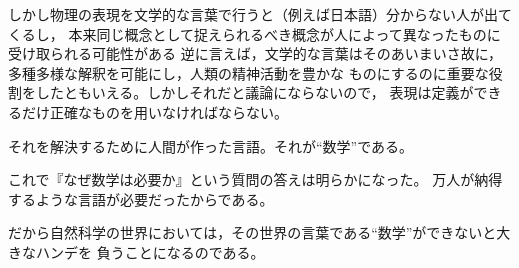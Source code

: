 しかし物理の表現を文学的な言葉で行うと（例えば日本語）分からない人が出てくるし，
本来同じ概念として捉えられるべき概念が人によって異なったものに受け取られる可能性がある
逆に言えば，文学的な言葉はそのあいまいさ故に，多種多様な解釈を可能にし，人類の精神活動を豊かな
ものにするのに重要な役割をしたともいえる。しかしそれだと議論にならないので，
表現は定義ができるだけ正確なものを用いなければならない。

それを解決するために人間が作った言語。それが“数学”である。

これで『なぜ数学は必要か』という質問の答えは明らかになった。
万人が納得するような言語が必要だったからである。

だから自然科学の世界においては，その世界の言葉である“数学”ができないと大きなハンデを
負うことになるのである。
